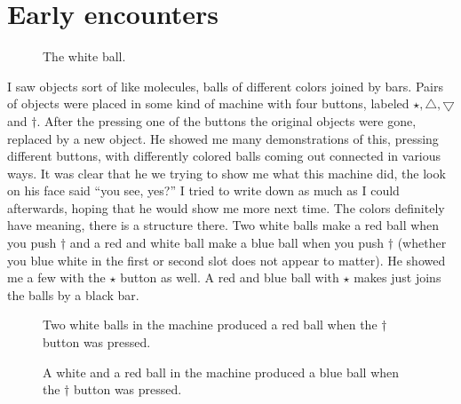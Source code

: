 \documentclass[12pt]{article}
\newcommand{\gcd}{\operatorname{gcd}}
\def\gcd{\bigtriangledown}
\def\lcm{\bigtriangleup}
\begin{document}
\section{Early encounters}
\begin{figure}
\centering
{}
\caption{The white ball.}
\end{figure}

I saw objects sort of like molecules, balls of different colors joined by bars.   Pairs of objects were placed in
some kind of machine with four buttons, labeled $\star, \lcm, \gcd$ and $\dagger$.  After the pressing one of the buttons the original
objects were gone, replaced by a new object.  He showed me many demonstrations of this, pressing different buttons, with differently colored balls coming out
connected in various ways.  It was clear that he we trying to show me what this machine did, the look on his face said ``you see, yes?''  I tried to write down as much
as I could afterwards, hoping that he would show me more next time.  The colors definitely have meaning, there is a structure there.  Two white balls
make a red ball when you push $\dagger$ and a red and white ball make a blue ball when you push $\dagger$ (whether you blue white in the first or second slot
does not appear to matter).  He showed me a few with the $\star$ button as well.  A red and blue ball with $\star$ makes just joins the balls by a black bar.  
\begin{figure}
\centering
{}
\caption{Two white balls in the machine produced a red ball when the $\dagger$ button was pressed.}
\end{figure}

\begin{figure}
\centering
{}
\caption{A white and a red ball in the machine produced a blue ball when the $\dagger$ button was pressed.}
\end{figure}
\end{document}
